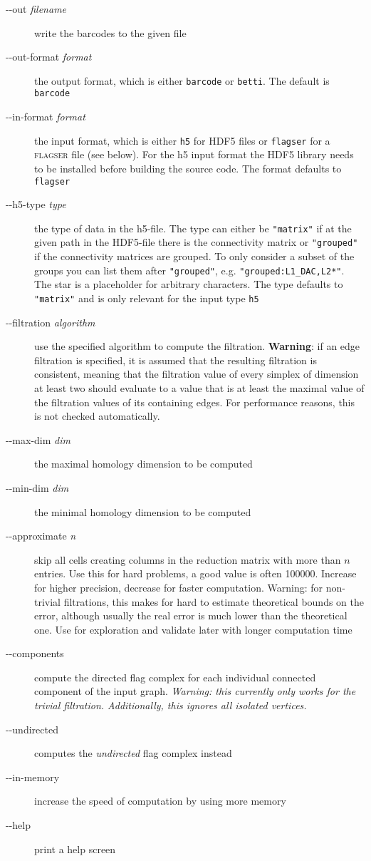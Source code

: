 \documentclass{amsart}
\theoremstyle{definition}
\begin{document}
\enlargethispage{\baselineskip}
\begin{description}
  \item [-{}-out \textit{filename}] write the barcodes to the given file
  \item [-{}-out-format \textit{format}] the output format, which is either \texttt{barcode} or
    \texttt{betti}. The default is \texttt{barcode}
  \item [-{}-in-format \textit{format}] the input format, which is either \texttt{h5} for HDF5 files
    or \texttt{flagser} for a \textsc{flagser} file (see below). For the h5 input format the HDF5
    library needs to be installed before building the source code. The format defaults to
    \texttt{flagser}
  \item [-{}-h5-type \textit{type}] the type of data in the h5-file. The type can either be
    \texttt{"matrix"} if at the given path in the HDF5-file there is the connectivity matrix or \texttt{"grouped"}
    if the connectivity matrices are grouped. To only consider a subset of the groups you can list
    them after \texttt{"grouped"}, e.g. \texttt{"grouped:L1\_DAC,L2*"}. The star is a placeholder for
    arbitrary characters. The type defaults to \texttt{"matrix"} and is only relevant for the input
    type \texttt{h5}
  \item [-{}-filtration \textit{algorithm}] use the specified algorithm to compute the filtration. \textbf{Warning}:
  if an edge filtration is specified, it is assumed that the resulting filtration is consistent, meaning that the
  filtration value of every simplex of dimension at least two should evaluate to a value that is at least the
  maximal value of the filtration values of its containing edges. For performance reasons, this is not checked
  automatically.
  \item [-{}-max-dim \textit{dim}] the maximal homology dimension to be computed
  \item [-{}-min-dim \textit{dim}] the minimal homology dimension to be computed
  \item [-{}-approximate \textit{n}] skip all cells creating columns in the reduction matrix with
    more than $n$ entries. Use this for hard problems, a good value is often 100000. Increase for
    higher precision, decrease for faster computation. Warning: for non-trivial filtrations, this
    makes for hard to estimate theoretical bounds on the error, although usually the real error is
    much lower than the theoretical one. Use for exploration and validate later with longer computation
    time
  \item [-{}-components] compute the directed flag complex for each individual connected
    component of the input graph. \emph{Warning: this currently only works for the trivial
    filtration. Additionally, this ignores all isolated vertices.}
  \item [-{}-undirected] computes the \emph{undirected} flag complex instead
  \item [-{}-in-memory] increase the speed of computation by using more memory
  \item [-{}-help] print a help screen
\end{description}
\end{document}
